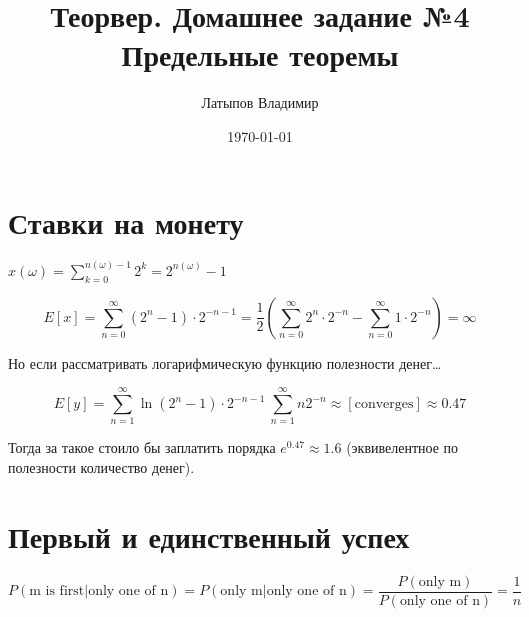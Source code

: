 \documentclass[12pt, a4paper]{article}
\title{Теорвер. Домашнее задание №4 \\ \large Предельные теоремы}
\author{
  Латыпов Владимир
}
\date{\today}
\begin{document}
\maketitle

\setcounter{section}{5}

\section{Ставки на монету}

$x(\omega) = \sum_{k = 0}^{n(\omega) - 1} 2^k = 2^{n(\omega)} - 1$

\begin{equation}
    E[x] = \sum_{n = 0}^{\infty} (2^n - 1) \cdot 2^{-n - 1} = \frac{1}{2} \left(\sum_{n = 0}^{\infty} 2^n \cdot 2^{-n} - \sum_{n = 0}^{\infty} 1 \cdot 2^{-n}\right) = \infty
\end{equation}

Но если рассматривать логарифмическую функцию полезности денег…

\begin{equation}
    E[y] = \sum_{n = 1}^{\infty} \ln (2^n - 1) \cdot 2^{-n - 1} ~ \sum_{n = 1}^{\infty} n 2^{-n} ≈ [\text{converges}] ≈ 0.47
\end{equation}

Тогда за такое стоило бы заплатить порядка $e^{0.47} ≈ 1.6$ (эквивелентное по полезности количество денег).


\setcounter{section}{11}

\section{Первый и единственный успех}

\begin{equation}
    P(\text{m is first} | \text{only one of n}) = P(\text{only m} | \text{only one of n}) = \frac{P(\text{only m})}{P(\text{only one of n})} = \frac{1}{n}
\end{equation}
\end{document}
